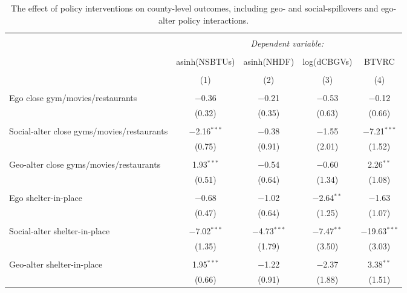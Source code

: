 
\begin{table}[!htbp] \centering 
  \caption{The effect of policy interventions on county-level outcomes, including geo- and social-spillovers and ego-alter policy interactions.} 
  \label{tab:diff_in_diff_with_sp_int} 
\footnotesize 
\begin{tabular}{@{\extracolsep{5pt}}lcccc} 
\\[-1.8ex]\hline 
\hline \\[-1.8ex] 
 & \multicolumn{4}{c}{\textit{Dependent variable:}} \\ 
\cline{2-5} 
\\[-1.8ex] & asinh(NSBTUs) & asinh(NHDF) & log(dCBGVs) & BTVRC \\ 
\\[-1.8ex] & (1) & (2) & (3) & (4)\\ 
\hline \\[-1.8ex] 
 Ego close gym/movies/restaurants & $-$0.36 & $-$0.21 & $-$0.53 & $-$0.12 \\ 
  & (0.32) & (0.35) & (0.63) & (0.66) \\ 
  & & & & \\ 
 Social-alter close gyms/movies/restaurants & $-$2.16$^{***}$ & $-$0.38 & $-$1.55 & $-$7.21$^{***}$ \\ 
  & (0.75) & (0.91) & (2.01) & (1.52) \\ 
  & & & & \\ 
 Geo-alter close gyms/movies/restaurants & 1.93$^{***}$ & $-$0.54 & $-$0.60 & 2.26$^{**}$ \\ 
  & (0.51) & (0.64) & (1.34) & (1.08) \\ 
  & & & & \\ 
 Ego shelter-in-place & $-$0.68 & $-$1.02 & $-$2.64$^{**}$ & $-$1.63 \\ 
  & (0.47) & (0.64) & (1.25) & (1.07) \\ 
  & & & & \\ 
 Social-alter shelter-in-place & $-$7.02$^{***}$ & $-$4.73$^{***}$ & $-$7.47$^{**}$ & $-$19.63$^{***}$ \\ 
  & (1.35) & (1.79) & (3.50) & (3.03) \\ 
  & & & & \\ 
 Geo-alter shelter-in-place & 1.95$^{***}$ & $-$1.22 & $-$2.37 & 3.38$^{**}$ \\ 
  & (0.66) & (0.91) & (1.88) & (1.51) \\ 

\end{tabular}
\end{table}
